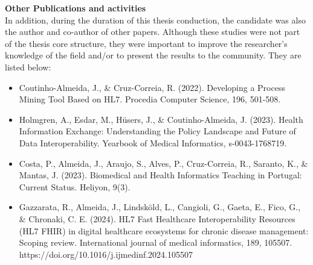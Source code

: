 \textbf{Other Publications and activities}\\
In addition, during the duration of this thesis conduction, the candidate was also the author and co-author of other papers. Although these studies were not part of the thesis core structure, they were important to improve the researcher's knowledge of the field and/or to present the results to the community. They are listed below:\\

\begin{itemize}

\item Coutinho-Almeida, J., \& Cruz-Correia, R. (2022). Developing a Process Mining Tool Based on HL7. Procedia Computer Science, 196, 501-508.\\


\item Holmgren, A., Esdar, M., Hüsers, J., \& Coutinho-Almeida, J. (2023). Health Information Exchange: Understanding the Policy Landscape and Future of Data Interoperability. Yearbook of Medical Informatics, s-0043-1768719.\\



\item Costa, P., Almeida, J., Araujo, S., Alves, P., Cruz-Correia, R., Saranto, K., \& Mantas, J. (2023). Biomedical and Health Informatics Teaching in Portugal: Current Status. Heliyon, 9(3).\\

\item Gazzarata, R., Almeida, J., Lindsköld, L., Cangioli, G., Gaeta, E., Fico, G., \& Chronaki, C. E. (2024). HL7 Fast Healthcare Interoperability Resources (HL7 FHIR) in digital healthcare ecosystems for chronic disease management: Scoping review. International journal of medical informatics, 189, 105507. https://doi.org/10.1016/j.ijmedinf.2024.105507
\end{itemize}